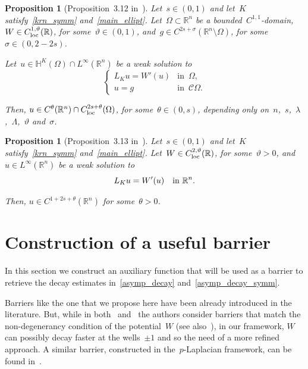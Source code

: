 \documentclass[10pt,a4paper]{amsart}
\newtheorem{prop}[theorem]{Proposition}
\numberwithin{equation}{section}
\newcommand{\Rn}{\mathbb{R}^n}
\newcommand{\R}{\mathbb{R}}
\newcommand{\Hbb}{\mathbb{H}^K}
\begin{document}
     \begin{prop}[Proposition~3.12 in~\cite{CP16}]\label{reg_dirichlet_pbm}
         Let~$s \in (0,1)$ and let~$K$ satisfy~\eqref{krn_symm} and~\eqref{main_ellipt}. Let~$\Omega \subset \Rn$ be a bounded~$C^{1,1}$-domain, $W \in C^{1,{\vartheta}}_{\rm loc}(\R)$, for some~${\vartheta} \in (0,1)$, and~$g \in C^{2s+{\sigma}}(\Rn \setminus \Omega)$, for some~${\sigma} \in (0,2-2s)$.
         
         Let~$u \in \Hbb(\Omega) \cap L^\infty (\Rn)$ be a weak solution to
           \begin{equation*}
        \begin{cases}
            L_K u = W'(u) & \mbox{in } \, \Omega,\\
             u = g & \mbox{in } \, \mathscr{C}\Omega.
        \end{cases}
    \end{equation*}
    
    Then, $u \in C^{{\theta}}(\Rn)\cap C^{2s+{\theta}}_{\rm loc}(\Omega)$, for some~${\theta} \in (0,s)$, depending only on~$n$,~$s$,~$\lambda$,~$\Lambda$,~$\vartheta$ and~${\sigma}$.      
     \end{prop}
 
     \begin{prop}[Proposition~3.13 in~\cite{CP16}]\label{reg_entire_sol}
              Let~$s \in (0,1)$ and let~$K$ satisfy~\eqref{krn_symm} and~\eqref{main_ellipt}. Let~$W \in C^{2,{\vartheta}}_{\rm loc}(\R)$, for some~$\vartheta>0$, and~$u \in L^\infty(\Rn)$ be a weak solution to
$$
{L}_K u = W\rq{}(u) \quad\mbox{in} \ \R^n.
$$    

Then, $u \in C^{1+2s+{\theta}}(\Rn)$ for some~${\theta} >0$.
     \end{prop}
     
 \section{Construction of a useful barrier}\label{usfbarrier}
 
 In this section we construct an auxiliary function that will be used as a barrier to retrieve the decay estimates in~\eqref{asymp_decay} and~\eqref{asymp_decay_symm}.

Barriers like the one that we propose here have been already
introduced in the literature. But,
while in both~\cite[Lemma~8]{PSV13} and~\cite[Lemma~4.1]{CP16} the authors consider barriers that match the non-degenerancy condition of the potential~$W$ (see also~\cite{SV14}),
in our framework, $W$ can possibly decay faster at the wells~$\pm 1$ and so the need of a more refined approach. A similar barrier, constructed in the~$p$-Laplacian framework, can be found in~\cite{giovanni}.
 
\end{document}
